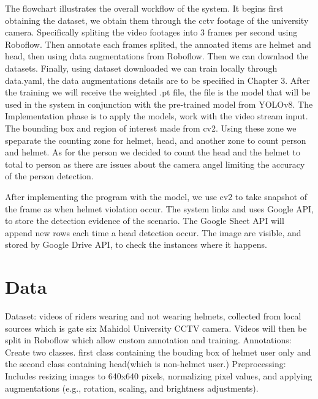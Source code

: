The flowchart illustrates the overall workflow of the system. It begins first obtaining the dataset, we obtain them through the cctv footage of the university camera. Specifically spliting the video footages into 3 frames per second using Roboflow. Then annotate each frames splited, the annoated items are helmet and head, then using data augmentations from Roboflow. Then we can downlaod the datasets. Finally, using dataset downloaded we can train locally through data.yaml, the data augmentations details are to be specified in Chapter 3. After the training we will receive the weighted .pt file, the file is the model that will be used in the system in conjunction with the pre-trained model from YOLOv8. The Implementation phase is to apply the models, work with the video stream input. The bounding box and region of interest made from cv2. Using these zone we speparate the counting zone for helmet, head, and another zone to count person and helmet. As for the person we decided to count the head and the helmet to total to person as there are issues about the camera angel limiting the accuracy of the person detection. 

After implementing the program with the model, we use cv2 to take snapshot of the frame as when helmet violation occur. The system links and uses Google API, to store the detection evidence of the scenario. The Google Sheet API will append new rows each time a head detection occur.  The image are visible, and stored by Google Drive API, to check the instances where it happens.

\section{Data}
Dataset: videos of riders wearing and not wearing helmets, collected from local sources which is gate six Mahidol University CCTV camera. Videos will then be split in Roboflow which allow custom annotation and training.
\newline
\newline
Annotations: Create two classes. first class containing the bouding box of helmet user only and the second class containing head(which is non-helmet user.)
\newline
Preprocessing: Includes resizing images to 640x640 pixels, normalizing pixel values, and applying augmentations (e.g., rotation, scaling, and brightness adjustments).

\newpage
